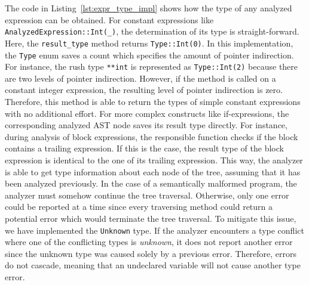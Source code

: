 The code in Listing~\ref{lst:expr_type_impl} shows how the type of any analyzed expression can be obtained.
For constant expressions like \verb|AnalyzedExpression::Int(_)|, the determination of its type is straight-forward.
Here, the \texttt{result\_type} method returns \verb|Type::Int(0)|.
In this implementation, the \texttt{Type} enum saves a count which specifies the amount of pointer indirection.
For instance, the rush type \texttt{**int} is represented as \verb|Type::Int(2)| because there are two levels of pointer indirection.
However, if the method is called on a constant integer expression, the resulting level of pointer indirection is zero.
Therefore, this method is able to return the types of simple constant expressions with no additional effort.
For more complex constructs like if-expressions,
the corresponding analyzed AST node saves its result type directly.
For instance, during analysis of block expressions,
the responsible function checks if the block contains a trailing expression.
If this is the case, the result type of the block expression is identical to the one of its trailing expression.
This way, the analyzer is able to get type information about each node of the tree, assuming that it has been analyzed previously.
In the case of a semantically malformed program,
the analyzer must somehow continue the tree traversal.
Otherwise, only one error could be reported at a time since every traversing method could return a potential error which would terminate the tree traversal.
To mitigate this issue, we have implemented the \texttt{Unknown} type.
If the analyzer encounters a type conflict where one of the conflicting types is \emph{unknown},
it does not report another error since the unknown type was caused solely by a previous error.
Therefore, errors do not cascade, meaning that an undeclared variable will not cause another type error.

